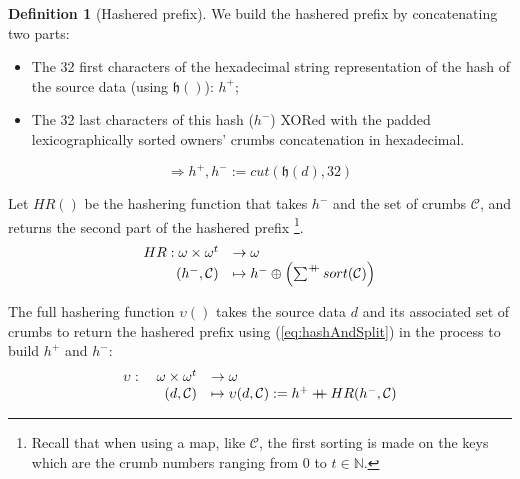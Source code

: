\documentclass[twoside,twocolumn]{article}
\newcommand{\concat}{\mathbin{{+}\mspace{-8mu}{+}}}
\theoremstyle{definition}
\newtheorem{definition}{Definition}
\theoremstyle{remark}
\begin{document}
\begin{definition}[Hashered prefix]
    \label{hashered}
    We build the hashered prefix by concatenating two parts:
    \begin{itemize}
        \item The 32 first characters of the hexadecimal string representation of the hash of the source data (using $\mathfrak{h}()$): $h^+$;
        \item The 32 last characters of this hash ($h^-$) XORed with the padded lexicographically sorted owners' crumbs concatenation in hexadecimal.
    \end{itemize}
    \begin{equation}
        \label{eq:hashAndSplit}
        \Rightarrow h^+, h^- := cut \left( \mathfrak{h}(d), 32 \right)
    \end{equation}

    \vspace{1em} %

    Let $HR()$ be the hashering function that takes $h^-$ and the set of crumbs $\mathcal{C}$, and returns the second part of the hashered prefix
    \footnote{Recall that when using a map, like $\mathcal{C}$, the first sorting is made on the keys which are the crumb numbers ranging from $0$ 
    to $t \in \mathbb{N}$.}.
    \begin{equation}
        \label{eq:hashering}
        \begin{array}{rl}
            HR: \omega \times \omega^t &\to \omega \\
                (h^-, \mathcal{C}) &\mapsto h^- \oplus \left( \sum^{\concat} sort(\mathcal{C}) \right)
        \end{array} 
    \end{equation}

    The full hashering function $\upsilon()$ takes the source data $d$ and its associated set of crumbs to return the hashered prefix using 
    (\ref{eq:hashAndSplit}) in the process to build $h^+$ and $h^-$:
    \begin{equation}
        \label{eq:hashered}
        \begin{array}{rl}
            \upsilon: \quad \omega \times \omega^t &\to \omega \\
                (d, \mathcal{C}) &\mapsto \upsilon(d, \mathcal{C}) := h^+ \concat HR(h^-, \mathcal{C}) \\
        \end{array}
    \end{equation}


\end{definition}
\end{document}

